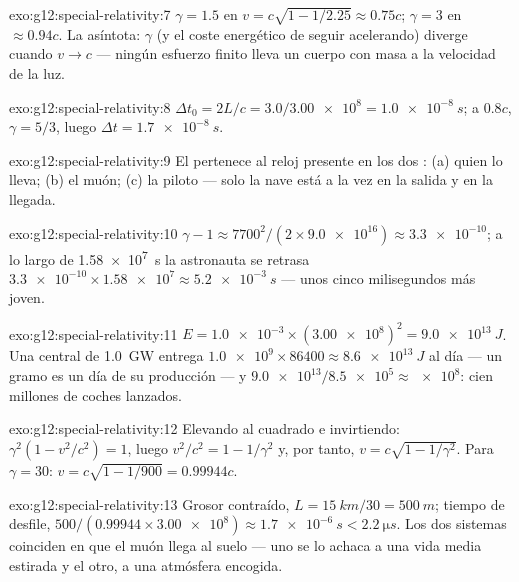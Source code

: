 \begin{solution}{exo:g12:special-relativity:7}
$\gamma = 1.5$ en $v = c\sqrt{1 - 1/2.25} \approx 0.75c$; $\gamma = 3$
en $\approx 0.94c$. La asíntota: $\gamma$ (y el coste energético de
seguir acelerando) diverge cuando $v \to c$ --- ningún esfuerzo finito
lleva un cuerpo con masa a la velocidad de la luz.
\end{solution}

\begin{solution}{exo:g12:special-relativity:8}
$\Delta t_0 = 2L/c = 3.0/\num{3.00e8} = \qty{1.0e-8}{s}$; a $0.8c$,
$\gamma = 5/3$, luego $\Delta t = \qty{1.7e-8}{s}$.
\end{solution}

\begin{solution}{exo:g12:special-relativity:9}
El  pertenece al reloj presente en los dos : (a)
quien lo lleva; (b) el muón; (c) la piloto --- solo la nave está a la
vez en la salida y en la llegada.
\end{solution}

\begin{solution}{exo:g12:special-relativity:10}
$\gamma - 1 \approx 7700^2/(2 \times \num{9.0e16}) \approx
\num{3.3e-10}$; a lo largo de \qty{1.58e7}{s} la astronauta se retrasa
$\num{3.3e-10} \times \num{1.58e7} \approx \qty{5.2e-3}{s}$ --- unos
cinco milisegundos más joven.
\end{solution}

\begin{solution}{exo:g12:special-relativity:11}
$E = \num{1.0e-3} \times (\num{3.00e8})^2 = \qty{9.0e13}{J}$. Una
central de \qty{1.0}{GW} entrega
$\num{1.0e9} \times 86400 \approx \qty{8.6e13}{J}$ al día --- un gramo
es un día de su producción --- y
$\num{9.0e13}/\num{8.5e5} \approx \num{e8}$: cien millones de coches
lanzados.
\end{solution}

\begin{solution}{exo:g12:special-relativity:12}
Elevando al cuadrado e invirtiendo: $\gamma^2(1 - v^2/c^2) = 1$, luego
$v^2/c^2 = 1 - 1/\gamma^2$ y, por tanto,
$v = c\sqrt{1 - 1/\gamma^2}$. Para $\gamma = 30$:
$v = c\sqrt{1 - 1/900} = 0.99944c$.
\end{solution}

\begin{solution}{exo:g12:special-relativity:13}
Grosor contraído, $L = \qty{15}{km}/30 = \qty{500}{m}$; tiempo de
desfile, $500/(0.99944 \times \num{3.00e8}) \approx \qty{1.7e-6}{s} <
\qty{2.2}{\micro s}$. Los dos sistemas coinciden en que el muón llega al
suelo --- uno se lo achaca a una vida media estirada y el otro, a una
atmósfera encogida.
\end{solution}

